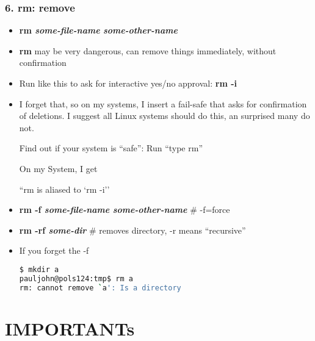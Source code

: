\documentclass[English]{beamer}
\begin{document}
\begin{frame}[containsverbatim]
  \frametitle {6. rm: remove}
  \begin{itemize}

  \item \textbf{rm \emph{some-file-name} \emph{some-other-name}}
    
  \item \textbf{rm} may be very dangerous, can remove things
     immediately, without confirmation 

   \item Run like this to ask for interactive yes/no approval: \textbf{rm -i}

   \item I forget that, so on my systems, I insert a fail-safe that
     asks for confirmation of deletions.  I suggest all Linux systems should
     do this, an surprised many do not.

    Find out if your system is ``safe'': Run ``type rm''

 On my System, I get 

``rm is aliased to `rm -i''


  \item \textbf{rm -f \emph{some-file-name} \emph{some-other-name}} \# -f=force 

  \item \textbf{rm -rf \emph{some-dir}} \# removes directory, -r
    means ``recursive''

\item If you forget the -f

\begin{lstlisting}[basicstyle={\tiny},breaklines=true,language=bash] 
$ mkdir a
pauljohn@pols124:tmp$ rm a
rm: cannot remove `a': Is a directory
\end{lstlisting}
  \end{itemize}
\end{frame}

\section{IMPORTANTs}
\end{document}
